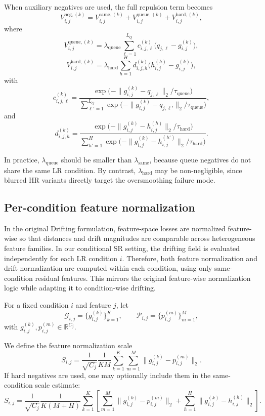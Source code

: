 \documentclass{article}
\begin{document}
When auxiliary negatives are used, the full repulsion term becomes
\[
V_{i,j}^{\mathrm{neg},(k)}
=
V_{i,j}^{\mathrm{same},(k)}
+
V_{i,j}^{\mathrm{queue},(k)}
+
V_{i,j}^{\mathrm{hard},(k)},
\]
where
\[
V_{i,j}^{\mathrm{queue},(k)}
=
\lambda_{\mathrm{queue}}
\sum_{\ell=1}^{L_Q}
c_{i,j,\ell}^{(k)}
\bigl(q_{j,\ell}-g_{i,j}^{(k)}\bigr),
\]
\[
V_{i,j}^{\mathrm{hard},(k)}
=
\lambda_{\mathrm{hard}}
\sum_{h=1}^{H}
d_{i,j,h}^{(k)}
\bigl(h_{i,j}^{(h)}-g_{i,j}^{(k)}\bigr),
\]
with
\[
c_{i,j,\ell}^{(k)}
=
\frac{\exp\!\bigl(-\|g_{i,j}^{(k)}-q_{j,\ell}\|_2/\tau_{\mathrm{queue}}\bigr)}
{\sum\limits_{\ell'=1}^{L_Q}\exp\!\bigl(-\|g_{i,j}^{(k)}-q_{j,\ell'}\|_2/\tau_{\mathrm{queue}}\bigr)},
\]
and
\[
d_{i,j,h}^{(k)}
=
\frac{\exp\!\bigl(-\|g_{i,j}^{(k)}-h_{i,j}^{(h)}\|_2/\tau_{\mathrm{hard}}\bigr)}
{\sum\limits_{h'=1}^{H}\exp\!\bigl(-\|g_{i,j}^{(k)}-h_{i,j}^{(h')}\|_2/\tau_{\mathrm{hard}}\bigr)}.
\]

In practice, \(\lambda_{\mathrm{queue}}\) should be smaller than \(\lambda_{\mathrm{same}}\), because queue negatives do not share the same LR condition. By contrast, \(\lambda_{\mathrm{hard}}\) may be non-negligible, since blurred HR variants directly target the oversmoothing failure mode.

\subsection{Per-condition feature normalization}

In the original Drifting formulation, feature-space losses are normalized feature-wise so that distances and drift magnitudes are comparable across heterogeneous feature families. In our conditional SR setting, the drifting field is evaluated independently for each LR condition \(i\). Therefore, both feature normalization and drift normalization are computed within each condition, using only same-condition residual features. This mirrors the original feature-wise normalization logic while adapting it to condition-wise drifting.

For a fixed condition \(i\) and feature \(j\), let
\[
\mathcal{G}_{i,j}=\{g_{i,j}^{(k)}\}_{k=1}^{K},
\qquad
\mathcal{P}_{i,j}=\{p_{i,j}^{(m)}\}_{m=1}^{M},
\]
with \(g_{i,j}^{(k)},p_{i,j}^{(m)}\in\mathbb{R}^{C_j}\).

We define the feature normalization scale
\[
S_{i,j}
=
\frac{1}{\sqrt{C_j}}
\frac{1}{KM}
\sum_{k=1}^{K}\sum_{m=1}^{M}
\|g_{i,j}^{(k)}-p_{i,j}^{(m)}\|_2.
\]
If hard negatives are used, one may optionally include them in the same-condition scale estimate:
\[
S_{i,j}
=
\frac{1}{\sqrt{C_j}}
\frac{1}{K(M+H)}
\sum_{k=1}^{K}
\left[
\sum_{m=1}^{M}\|g_{i,j}^{(k)}-p_{i,j}^{(m)}\|_2
+
\sum_{h=1}^{H}\|g_{i,j}^{(k)}-h_{i,j}^{(h)}\|_2
\right].
\]
\end{document}
